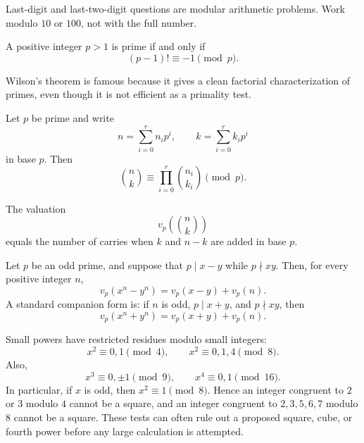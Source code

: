     \begin{strategy}
        Last-digit and last-two-digit questions are modular arithmetic problems.
        Work modulo $10$ or $100$, not with the full number.
    \end{strategy}

    \begin{theorem}
        A positive integer $p>1$ is prime if and only if
        \[
            (p-1)!\equiv -1\pmod p.
        \]
    \end{theorem}

    \begin{remark}
        Wilson's theorem is famous because it gives a clean factorial
        characterization of primes, even though it is not efficient as a
        primality test.
    \end{remark}

    \begin{theorem}
        Let $p$ be prime and write
        \[
            n=\sum_{i=0}^{r}n_ip^i,
            \qquad
            k=\sum_{i=0}^{r}k_ip^i
        \]
        in base $p$. Then
        \[
            \binom{n}{k}
            \equiv
            \prod_{i=0}^{r}\binom{n_i}{k_i}
            \pmod p.
        \]
    \end{theorem}

    \begin{theorem}
        The valuation
        \[
            v_p\!\left(\binom{n}{k}\right)
        \]
        equals the number of carries when $k$ and $n-k$ are added in base $p$.
    \end{theorem}

    \begin{theorem}
        Let $p$ be an odd prime, and suppose that $p\mid x-y$ while
        $p\nmid xy$. Then, for every positive integer $n$,
        \[
            v_p(x^n-y^n)
            =
            v_p(x-y)+v_p(n).
        \]
        A standard companion form is: if $n$ is odd, $p\mid x+y$, and
        $p\nmid xy$, then
        \[
            v_p(x^n+y^n)
            =
            v_p(x+y)+v_p(n).
        \]
    \end{theorem}

    \begin{fact}
        Small powers have restricted residues modulo small integers:
        \[
            x^2\equiv 0,1\pmod 4,
            \qquad
            x^2\equiv 0,1,4\pmod 8.
        \]
        Also,
        \[
            x^3\equiv0,\pm1\pmod9,
            \qquad
            x^4\equiv0,1\pmod{16}.
        \]
        In particular, if $x$ is odd, then $x^2\equiv1\pmod8$.
        Hence an integer congruent to $2$ or $3$ modulo $4$ cannot be a
        square, and an integer congruent to $2,3,5,6,7$ modulo $8$ cannot be a
        square. These tests can often rule out a proposed square, cube, or fourth
        power before any large calculation is attempted.
    \end{fact}

